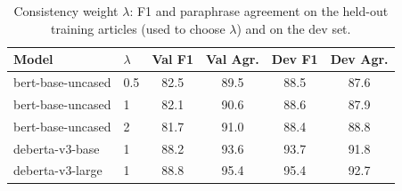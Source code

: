 \begin{table}[t]
\centering\small
\begin{tabular}{llcccc}
\toprule
\textbf{Model} & $\lambda$ & \textbf{Val F1} & \textbf{Val Agr.} & \textbf{Dev F1} & \textbf{Dev Agr.} \\
\midrule
bert-base-uncased & 0.5 & 82.5 & 89.5 & 88.5 & 87.6 \\
bert-base-uncased & 1 & 82.1 & 90.6 & 88.6 & 87.9 \\
bert-base-uncased & 2 & 81.7 & 91.0 & 88.4 & 88.8 \\
deberta-v3-base & 1 & 88.2 & 93.6 & 93.7 & 91.8 \\
deberta-v3-large & 1 & 88.8 & 95.4 & 95.4 & 92.7 \\
\bottomrule
\end{tabular}
\caption{Consistency weight $\lambda$: F1 and paraphrase agreement on the held-out training articles (used to choose $\lambda$) and on the dev set.}
\label{tab:lambda}
\end{table}
